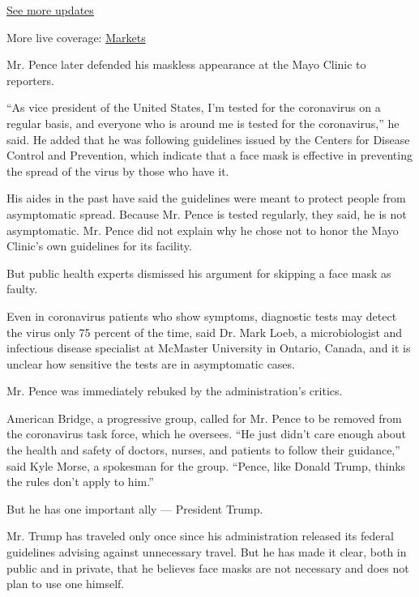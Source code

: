 \href{https://www.nytimes.com/2020/08/04/world/coronavirus-cases.html?action=click\&pgtype=Article\&state=default\&region=MAIN_CONTENT_1\&context=storylines_live_updates}{See
more updates}

More live coverage:
\href{https://www.nytimes.com/live/2020/08/04/business/stock-market-today-coronavirus?action=click\&pgtype=Article\&state=default\&region=MAIN_CONTENT_1\&context=storylines_live_updates}{Markets}

Mr. Pence later defended his maskless appearance at the Mayo Clinic to
reporters.

``As vice president of the United States, I'm tested for the coronavirus
on a regular basis, and everyone who is around me is tested for the
coronavirus,'' he said. He added that he was following guidelines issued
by the Centers for Disease Control and Prevention, which indicate that a
face mask is effective in preventing the spread of the virus by those
who have it.

His aides in the past have said the guidelines were meant to protect
people from asymptomatic spread. Because Mr. Pence is tested regularly,
they said, he is not asymptomatic. Mr. Pence did not explain why he
chose not to honor the Mayo Clinic's own guidelines for its facility.

But public health experts dismissed his argument for skipping a face
mask as faulty.

Even in coronavirus patients who show symptoms, diagnostic tests may
detect the virus only 75 percent of the time, said Dr. Mark Loeb, a
microbiologist and infectious disease specialist at McMaster University
in Ontario, Canada, and it is unclear how sensitive the tests are in
asymptomatic cases.

Mr. Pence was immediately rebuked by the administration's critics.

American Bridge, a progressive group, called for Mr. Pence to be removed
from the coronavirus task force, which he oversees. ``He just didn't
care enough about the health and safety of doctors, nurses, and patients
to follow their guidance,'' said Kyle Morse, a spokesman for the group.
``Pence, like Donald Trump, thinks the rules don't apply to him.''

But he has one important ally --- President Trump.

Mr. Trump has traveled only once since his administration released its
federal guidelines advising against unnecessary travel. But he has made
it clear, both in public and in private, that he believes face masks are
not necessary and does not plan to use one himself.


